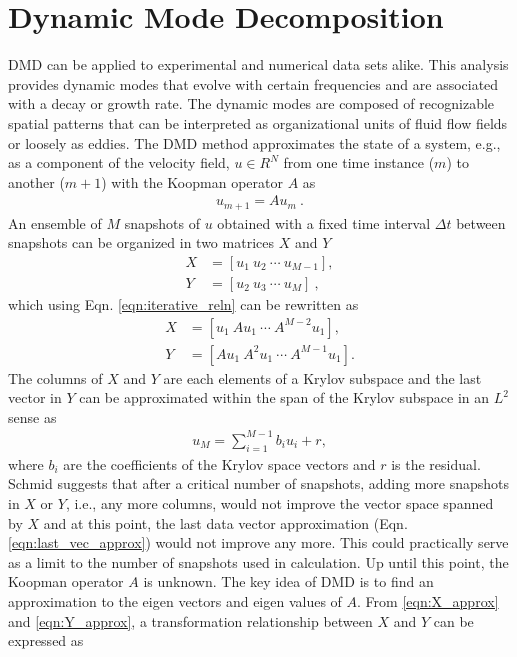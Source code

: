\section{Dynamic Mode Decomposition} DMD can be applied to experimental and numerical data sets alike. This analysis provides dynamic modes that evolve with certain frequencies and are associated with a decay or growth rate. The dynamic modes are composed of recognizable spatial patterns that can be interpreted as organizational units of fluid flow fields or loosely as eddies. The DMD method approximates the state of a system, e.g., as a component of the velocity field, $u \in R^{N}$ from one time instance ($m$) to another ($m+1$) with the Koopman operator $A$ as
\begin{align}
u_{m+1}= A u_{m}\ .
\label{eqn:iterative_reln}
\end{align}
An ensemble of $M$ snapshots of $u$ obtained with a fixed time interval $\Delta t$ between snapshots can be organized in two matrices $X$ and $Y$
\begin{align}
X & = [u_{1}\ u_{2} \ \cdots \ u_{M-1}], \\
Y & = [u_{2}\ u_{3} \ \cdots \ u_{M}]\ ,
\end{align}
which using Eqn. \ref{eqn:iterative_reln} can be rewritten as
\begin{align}
X & = [u_{1}\ Au_{1} \ \cdots \ A^{M-2}u_{1}] \label{eqn:X_approx}, \\
Y & = [Au_{1}\ A^{2}u_{1} \ \cdots \ A^{M-1}u_{1}] \label{eqn:Y_approx}. 
\end{align}
The columns of $X$ and $Y$ are each elements of a Krylov subspace and the last vector in $Y$ can be approximated within the span of the Krylov subspace in an $L^{2}$ sense \citep{kutz_book2013} as
\begin{align}
u_{M} = \sum_{i=1}^{M-1}b_{i} u_{i}+ r,
\label{eqn:last_vec_approx}
\end{align}
where $b_i$ are the coefficients of the Krylov space vectors and $r$ is the residual. Schmid \citep{schmid_jfm2010} suggests that after a critical number of snapshots, adding more snapshots in $X$ or $Y$, i.e., any more columns, would not improve the vector space spanned by $X$ and at this point, the last data vector approximation (Eqn. \ref{eqn:last_vec_approx}) would not improve any more. This could practically serve as a limit to the number of snapshots used in calculation. Up until this point, the Koopman operator $A$ is unknown. The key idea of DMD is to find an approximation to the eigen vectors and eigen values of $A$. From \ref{eqn:X_approx} and \ref{eqn:Y_approx}, a transformation relationship between $X$ and $Y$ can be expressed as
